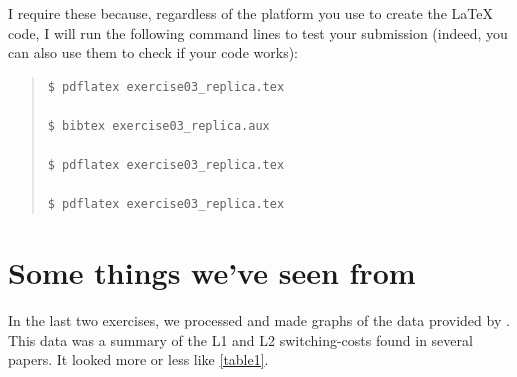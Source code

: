 \documentclass[11pt,a4paper]{scrartcl}
\begin{document}
I require these because, regardless of the platform you use to create the LaTeX code,
I will run the following command lines to test your submission (indeed, you can also use
them to check if your code works):

\begin{quote}
\begin{verbatim}
$ pdflatex exercise03_replica.tex

$ bibtex exercise03_replica.aux

$ pdflatex exercise03_replica.tex

$ pdflatex exercise03_replica.tex
\end{verbatim}
\end{quote}

\newpage
\section[Some things we’ve seen from Gade et al. (2021)]{Some things we’ve seen from \textcite{gade2021}}

In the last two exercises, we processed and made graphs of the data provided by \textcite{gade2021}. This data was a summary of the L1 and L2 switching-costs found in several
papers. It looked more or less like \autoref{table1}.
\end{document}
